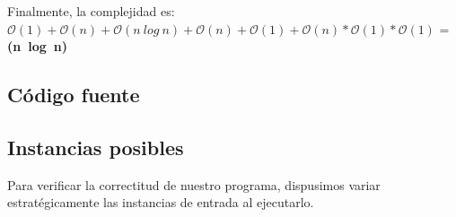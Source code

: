 Finalmente, la complejidad es: $\mathcal{O}(1)+\mathcal{O}(n)+\mathcal{O}(n\ log\ n)+\mathcal{O}(n)+\mathcal{O}(1)+\mathcal{O}(n)*\mathcal{O}(1)*\mathcal{O}(1)$ = \textbf{(n\ log\ n)}

\subsection{Código fuente}



\subsection{Instancias posibles}

Para verificar la correctitud de nuestro programa, dispusimos variar estratégicamente las instancias de entrada al ejecutarlo.
